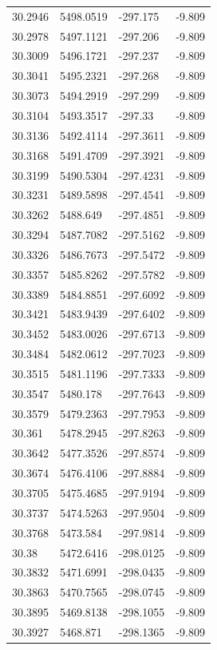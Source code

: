\begin{table}[H]
\begin{tabular}{llll}
30.2946 & 5498.0519 & -297.175 & -9.809 \\
30.2978 & 5497.1121 & -297.206 & -9.809 \\
30.3009 & 5496.1721 & -297.237 & -9.809 \\
30.3041 & 5495.2321 & -297.268 & -9.809 \\
30.3073 & 5494.2919 & -297.299 & -9.809 \\
30.3104 & 5493.3517 & -297.33 & -9.809 \\
30.3136 & 5492.4114 & -297.3611 & -9.809 \\
30.3168 & 5491.4709 & -297.3921 & -9.809 \\
30.3199 & 5490.5304 & -297.4231 & -9.809 \\
30.3231 & 5489.5898 & -297.4541 & -9.809 \\
30.3262 & 5488.649 & -297.4851 & -9.809 \\
30.3294 & 5487.7082 & -297.5162 & -9.809 \\
30.3326 & 5486.7673 & -297.5472 & -9.809 \\
30.3357 & 5485.8262 & -297.5782 & -9.809 \\
30.3389 & 5484.8851 & -297.6092 & -9.809 \\
30.3421 & 5483.9439 & -297.6402 & -9.809 \\
30.3452 & 5483.0026 & -297.6713 & -9.809 \\
30.3484 & 5482.0612 & -297.7023 & -9.809 \\
30.3515 & 5481.1196 & -297.7333 & -9.809 \\
30.3547 & 5480.178 & -297.7643 & -9.809 \\
30.3579 & 5479.2363 & -297.7953 & -9.809 \\
30.361 & 5478.2945 & -297.8263 & -9.809 \\
30.3642 & 5477.3526 & -297.8574 & -9.809 \\
30.3674 & 5476.4106 & -297.8884 & -9.809 \\
30.3705 & 5475.4685 & -297.9194 & -9.809 \\
30.3737 & 5474.5263 & -297.9504 & -9.809 \\
30.3768 & 5473.584 & -297.9814 & -9.809 \\
30.38 & 5472.6416 & -298.0125 & -9.809 \\
30.3832 & 5471.6991 & -298.0435 & -9.809 \\
30.3863 & 5470.7565 & -298.0745 & -9.809 \\
30.3895 & 5469.8138 & -298.1055 & -9.809 \\
30.3927 & 5468.871 & -298.1365 & -9.809 \\

\end{tabular}
\end{table}

